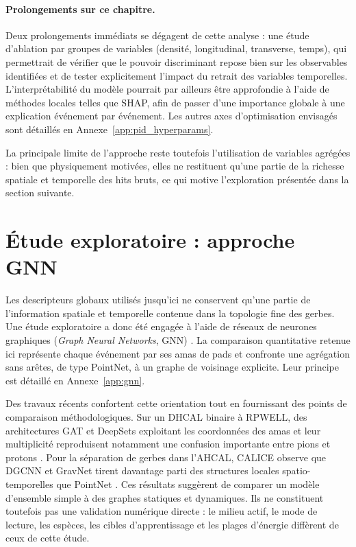 \paragraph{Prolongements sur ce chapitre.}

Deux prolongements immédiats se dégagent de cette analyse : une étude d'ablation par groupes de variables (densité, longitudinal, transverse, temps), qui permettrait de vérifier que le pouvoir discriminant repose bien sur les observables identifiées et de tester explicitement l'impact du retrait des variables temporelles. L'interprétabilité du modèle pourrait par ailleurs être approfondie à l'aide de méthodes locales telles que SHAP, afin de passer d'une importance globale à une explication événement par événement. Les autres axes d'optimisation envisagés sont détaillés en Annexe~\ref{app:pid_hyperparams}.

La principale limite de l'approche reste toutefois l'utilisation de variables agrégées : bien que physiquement motivées, elles ne restituent qu'une partie de la richesse spatiale et temporelle des hits bruts, ce qui motive l'exploration présentée dans la section suivante.

\section{Étude exploratoire : approche GNN}
\label{sec:pid-gnn}

Les descripteurs globaux utilisés jusqu'ici ne conservent qu'une partie de l'information spatiale et temporelle contenue dans la topologie fine des gerbes. Une étude exploratoire a donc été engagée à l'aide de réseaux de neurones graphiques (\emph{Graph Neural Networks}, GNN) \cite{scarselli2009, shlomi2021, qu2020}. La comparaison quantitative retenue ici représente chaque événement par ses amas de pads et confronte une agrégation sans arêtes, de type PointNet, à un graphe de voisinage explicite. Leur principe est détaillé en Annexe~\ref{app:gnn}.

Des travaux récents confortent cette orientation tout en fournissant des points de comparaison méthodologiques. Sur un DHCAL binaire à RPWELL, des architectures GAT et DeepSets exploitant les coordonnées des amas et leur multiplicité reproduisent notamment une confusion importante entre pions et protons \cite{borysova2025dhcalgnn}. Pour la séparation de gerbes dans l'AHCAL, CALICE observe que DGCNN et GravNet tirent davantage parti des structures locales spatio-temporelles que PointNet \cite{calice2024showerseparation}. Ces résultats suggèrent de comparer un modèle d'ensemble simple à des graphes statiques et dynamiques. Ils ne constituent toutefois pas une validation numérique directe : le milieu actif, le mode de lecture, les espèces, les cibles d'apprentissage et les plages d'énergie diffèrent de ceux de cette étude.

